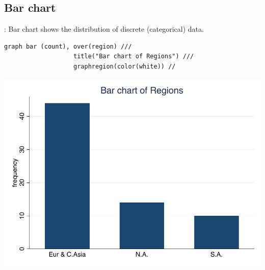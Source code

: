 \subsection{Bar chart}
\begin{frame}[fragile]{\secname: \subsecname}
Bar chart shows the distribution of discrete (categorical) data.
\begin{verbatim}
graph bar (count), over(region) ///
                   title("Bar chart of Regions") ///
                   graphregion(color(white)) //
\end{verbatim}

\begin{center}
	\includegraphics[scale=0.5]{images/bar}
\end{center}
\end{frame}


